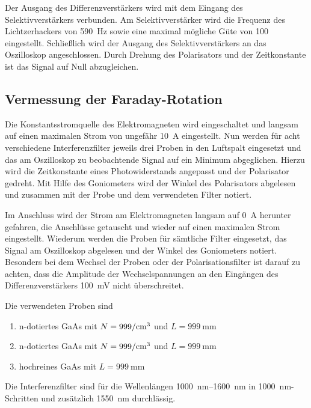 Der Ausgang des Differenzverstärkers wird mit dem Eingang des
Selektivverstärkers verbunden. Am Selektivverstärker wird die
Frequenz des Lichtzerhackers von \SI{590}{\hertz} sowie eine
maximal mögliche Güte von \num{100} eingestellt.
Schließlich wird der Ausgang des Selektivverstärkers an das Oszilloskop
angeschlossen. Durch Drehung des Polarisators und der Zeitkonstante
ist das Signal auf Null abzugleichen.


\subsection{Vermessung der Faraday-Rotation}
\label{sec:MessungFaraday}

Die Konstantsstromquelle des Elektromagneten wird eingeschaltet und
langsam auf einen maximalen Strom von ungefähr \SI{10}{\ampere}
eingestellt. Nun werden für acht verschiedene Interferenzfilter
jeweils drei Proben in den Luftspalt eingesetzt und
das am Oszilloskop zu beobachtende Signal auf ein Minimum abgeglichen.
Hierzu wird die Zeitkonstante eines Photowiderstands angepasst und
der Polarisator gedreht. Mit Hilfe des Goniometers wird der Winkel
des Polarisators abgelesen und zusammen mit der Probe und dem verwendeten
Filter notiert.

Im Anschluss wird der Strom am Elektromagneten langsam auf \SI{0}{\ampere}
herunter gefahren, die Anschlüsse getauscht und wieder auf einen maximalen
Strom eingestellt. Wiederum werden die Proben für sämtliche Filter
eingesetzt, das Signal am Oszilloskop abgelesen und der Winkel des
Goniometers notiert.
Besonders bei dem Wechsel der Proben oder der Polarisationsfilter
ist darauf zu achten, dass die Amplitude der Wechselspannungen an den
Eingängen des Differenzverstärkers \SI{100}{\milli\volt} nicht
überschreitet.

Die verwendeten Proben sind
\begin{enumerate}
  \item n-dotiertes GaAs mit
  $N = \SI{999}{\raiseto{-3}\centi\meter}$ und
  $L = \SI{999}{\milli\meter}$
  \item n-dotiertes GaAs mit
  $N = \SI{999}{\raiseto{-3}\centi\meter}$ und
  $L = \SI{999}{\milli\meter}$
  \item hochreines GaAs mit
  $L = \SI{999}{\milli\meter}$
\end{enumerate}
Die Interferenzfilter sind für die Wellenlängen
\SIrange{1000}{1600}{\nano\meter} in \SI{1000}{\nano\meter}-Schritten
und zusätzlich \SI{1550}{\nano\meter} durchlässig.
